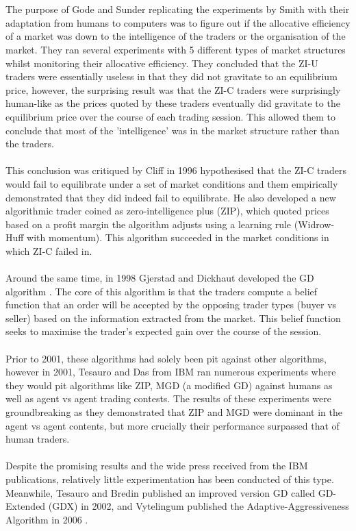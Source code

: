 \documentclass[ %
                    author={Ashwinder Khurana},
                supervisor={Prof Dave Cliff},
                    degree={MEng},
                     title={The Deeply Reinforced Trader},
                  subtitle={},
                      type={enterprise},
                      year={2020} ]{dissertation}
\begin{document}
\\
\\
The purpose of Gode and Sunder replicating the experiments by Smith with their adaptation from humans to computers was to figure out if the {\color{red}allocative efficiency} of a market was down to the intelligence of the traders or the organisation of the market. They ran several experiments with 5 different types of market structures whilst monitoring their allocative efficiency. They concluded that the ZI-U traders were essentially useless in that they did not gravitate to an equilibrium price, however, the surprising result was that the ZI-C traders were surprisingly human-like as the prices quoted by these traders eventually did gravitate to the equilibrium price over the course of each trading session. This allowed them to conclude that most of the 'intelligence' was in the market structure rather than the traders. 
\\
\\
This conclusion was critiqued by Cliff in 1996 \cite{Cliff-critique} hypothesised that the ZI-C traders would fail to equilibrate under a set of market conditions and them empirically demonstrated that they did indeed fail to equilibrate. He also developed a new algorithmic trader coined as zero-intelligence plus (ZIP), which quoted prices based on a profit margin the algorithm adjusts using a learning rule (Widrow-Huff with momentum). This algorithm succeeded in the market conditions in which ZI-C failed in. 
\\
\\
Around the same time, in 1998 Gjerstad and Dickhaut developed the GD algorithm \cite{GD}. The core of this algorithm is that the traders compute a belief function that an order will be accepted by the opposing trader types (buyer vs seller) based on the information extracted from the market. This belief function seeks to maximise the trader's expected gain over the course of the session.
\\
\\
Prior to 2001, these algorithms had solely been pit against other algorithms, however in 2001, Tesauro and Das from IBM \cite{IBM experiments} ran numerous experiments where they would pit algorithms like ZIP, MGD (a modified GD) against humans as well as agent vs agent trading contests. The results of these experiments were groundbreaking as they demonstrated that ZIP and MGD were dominant in the agent vs agent contents, but more crucially their performance surpassed that of human traders. 
\\
\\
Despite the promising results and the wide press received from the IBM publications, relatively little experimentation has been conducted of this type. Meanwhile, Tesauro and Bredin published an improved version GD called GD-Extended (GDX) in 2002, and Vytelingum published the Adaptive-Aggressiveness Algorithm in 2006 \cite{AA}.
\end{document}
